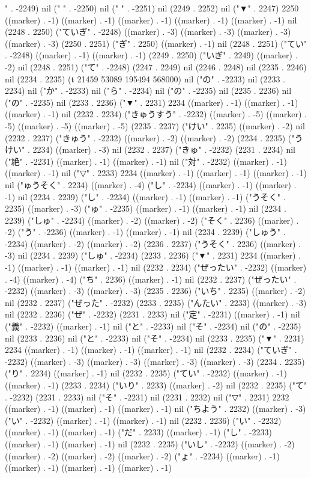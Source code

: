 " . -2249) nil (" " . -2250) nil (" " . -2251) nil (2249 . 2252) nil ("▼" . 2247) 2250 ((marker) . -1) ((marker) . -1) ((marker) . -1) ((marker) . -1) ((marker) . -1) nil (2248 . 2250) ("ていぎ" . -2248) ((marker) . -3) ((marker) . -3) ((marker) . -3) ((marker) . -3) (2250 . 2251) ("ぎ" . 2250) ((marker) . -1) nil (2248 . 2251) ("てい" . -2248) ((marker) . -1) ((marker) . -1) (2249 . 2250) ("いぎ" . 2249) ((marker) . -2) nil (2248 . 2251) ("て" . -2248) (2247 . 2249) nil (2246 . 2248) nil (2235 . 2246) nil (2234 . 2235) (t 21459 53089 195494 568000) nil ("の" . -2233) nil (2233 . 2234) nil ("か" . -2233) nil ("ら" . -2234) nil ("の" . -2235) nil (2235 . 2236) nil ("の" . -2235) nil (2233 . 2236) ("▼" . 2231) 2234 ((marker) . -1) ((marker) . -1) ((marker) . -1) nil (2232 . 2234) ("きゅうすう" . -2232) ((marker) . -5) ((marker) . -5) ((marker) . -5) ((marker) . -5) (2235 . 2237) ("けい" . 2235) ((marker) . -2) nil (2232 . 2237) ("きゅう" . -2232) ((marker) . -2) ((marker) . -2) (2234 . 2235) ("うけい" . 2234) ((marker) . -3) nil (2232 . 2237) ("きゅ" . -2232) (2231 . 2234) nil ("絶" . -2231) ((marker) . -1) ((marker) . -1) nil ("対" . -2232) ((marker) . -1) ((marker) . -1) nil ("▽" . 2233) 2234 ((marker) . -1) ((marker) . -1) ((marker) . -1) nil ("ゅうそく" . 2234) ((marker) . -4) ("し" . -2234) ((marker) . -1) ((marker) . -1) nil (2234 . 2239) ("し" . -2234) ((marker) . -1) ((marker) . -1) ("うそく" . 2235) ((marker) . -3) ("ゅ" . -2235) ((marker) . -1) ((marker) . -1) nil (2234 . 2239) ("しゅ" . -2234) ((marker) . -2) ((marker) . -2) ("そく" . 2236) ((marker) . -2) ("う" . -2236) ((marker) . -1) ((marker) . -1) nil (2234 . 2239) ("しゅう" . -2234) ((marker) . -2) ((marker) . -2) (2236 . 2237) ("うそく" . 2236) ((marker) . -3) nil (2234 . 2239) ("しゅ" . -2234) (2233 . 2236) ("▼" . 2231) 2234 ((marker) . -1) ((marker) . -1) ((marker) . -1) nil (2232 . 2234) ("ぜったい" . -2232) ((marker) . -4) ((marker) . -4) ("ち" . 2236) ((marker) . -1) nil (2232 . 2237) ("ぜったい" . -2232) ((marker) . -3) ((marker) . -3) (2235 . 2236) ("いち" . 2235) ((marker) . -2) nil (2232 . 2237) ("ぜった" . -2232) (2233 . 2235) ("んたい" . 2233) ((marker) . -3) nil (2232 . 2236) ("ぜ" . -2232) (2231 . 2233) nil ("定" . -2231) ((marker) . -1) nil ("義" . -2232) ((marker) . -1) nil ("と" . -2233) nil ("そ" . -2234) nil ("の" . -2235) nil (2233 . 2236) nil ("と" . -2233) nil ("そ" . -2234) nil (2233 . 2235) ("▼" . 2231) 2234 ((marker) . -1) ((marker) . -1) ((marker) . -1) nil (2232 . 2234) ("ていぎ" . -2232) ((marker) . -3) ((marker) . -3) ((marker) . -3) ((marker) . -3) (2234 . 2235) ("り" . 2234) ((marker) . -1) nil (2232 . 2235) ("てい" . -2232) ((marker) . -1) ((marker) . -1) (2233 . 2234) ("いり" . 2233) ((marker) . -2) nil (2232 . 2235) ("て" . -2232) (2231 . 2233) nil ("そ" . -2231) nil (2231 . 2232) nil ("▽" . 2231) 2232 ((marker) . -1) ((marker) . -1) ((marker) . -1) nil ("ちよう" . 2232) ((marker) . -3) ("い" . -2232) ((marker) . -1) ((marker) . -1) nil (2232 . 2236) ("い" . -2232) ((marker) . -1) ((marker) . -1) ("だ" . 2233) ((marker) . -1) ("し" . -2233) ((marker) . -1) ((marker) . -1) nil (2232 . 2235) ("いし" . -2232) ((marker) . -2) ((marker) . -2) ((marker) . -2) ((marker) . -2) ("ょ" . -2234) ((marker) . -1) ((marker) . -1) ((marker) . -1) ((marker) . -1) 